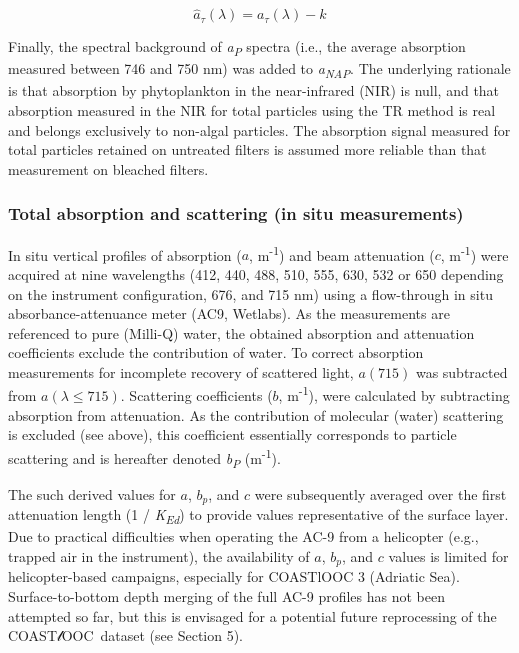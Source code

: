 \documentclass[essd, manuscript]{copernicus}
\newcommand{\coastlooc}{COAST$\mathscr{l}$OOC~\allowbreak}
\begin{document}
\begin{equation}
    \hat{a}_\tau(\lambda) = a_\tau(\lambda) - k
\end{equation}

Finally, the spectral background of \textit{a\textsubscript{P}} spectra (i.e., the average absorption measured between 746 and 750 nm) was added to \textit{a\textsubscript{NAP}}. The underlying rationale is that absorption by phytoplankton in the near-infrared (NIR) is null, and that absorption measured in the NIR for total particles using the TR method is real \citep{Tassan2003} and belongs exclusively to non-algal particles. The absorption signal measured for total particles retained on untreated filters is assumed more reliable than that measurement on bleached filters.

\subsubsection{Total absorption and scattering (in situ measurements)}

In situ vertical profiles of absorption ($a$, m\textsuperscript{-1}) and beam attenuation ($c$, m\textsuperscript{-1}) were acquired at nine wavelengths (412, 440, 488, 510, 555, 630, 532 or 650 depending on the instrument configuration, 676, and 715 nm) using a flow-through in situ absorbance-attenuance meter (AC9, Wetlabs). As the measurements are referenced to pure (Milli-Q) water, the obtained absorption and attenuation coefficients exclude the contribution of water. To correct absorption measurements for incomplete recovery of scattered light, $a(715)$ was subtracted from $a(\lambda \le 715)$. Scattering coefficients ($b$, m\textsuperscript{-1}), were calculated by subtracting absorption from attenuation. As the contribution of molecular (water) scattering is excluded (see above), this coefficient essentially corresponds to particle scattering and is hereafter denoted \textit{b\textsubscript{P}} (m\textsuperscript{-1}).

The such derived values for $a$, $b_p$, and $c$ were subsequently averaged over the first attenuation length (1 / \textit{K\textsubscript{Ed}}) to provide values representative of the surface layer. Due to practical difficulties when operating the AC-9 from a helicopter (e.g., trapped air in the instrument), the availability of  $a$, $b_p$, and $c$ values is limited for helicopter-based campaigns, especially for COASTlOOC 3 (Adriatic Sea). Surface-to-bottom depth merging of the full AC-9 profiles has not been attempted so far, but this is envisaged for a potential future reprocessing of the \coastlooc dataset (see Section 5).
\end{document}
